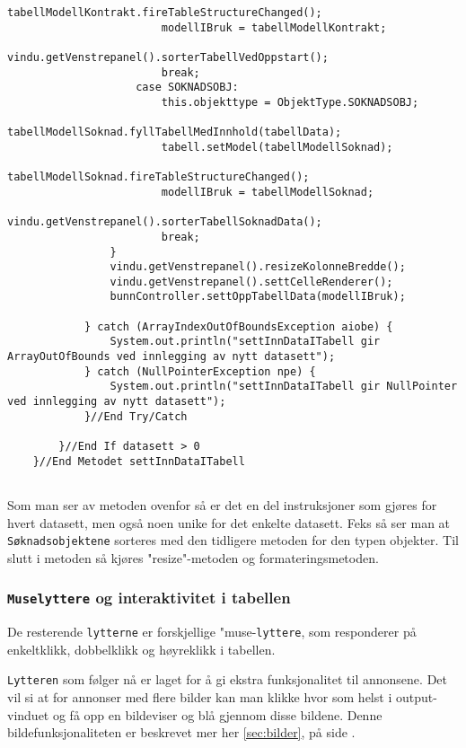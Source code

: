 \begin{lstlisting}[caption=Metoden \texttt{settInnDataITabell} i \texttt{ControllerTabell.java}]
                        tabellModellKontrakt.fireTableStructureChanged();
                        modellIBruk = tabellModellKontrakt;
                        vindu.getVenstrepanel().sorterTabellVedOppstart();
                        break;
                    case SOKNADSOBJ:
                        this.objekttype = ObjektType.SOKNADSOBJ;
                        tabellModellSoknad.fyllTabellMedInnhold(tabellData);
                        tabell.setModel(tabellModellSoknad);
                        tabellModellSoknad.fireTableStructureChanged();
                        modellIBruk = tabellModellSoknad;
                        vindu.getVenstrepanel().sorterTabellSoknadData();
                        break;
                }
                vindu.getVenstrepanel().resizeKolonneBredde();
                vindu.getVenstrepanel().settCelleRenderer();
                bunnController.settOppTabellData(modellIBruk);

            } catch (ArrayIndexOutOfBoundsException aiobe) {
                System.out.println("settInnDataITabell gir ArrayOutOfBounds ved innlegging av nytt datasett");
            } catch (NullPointerException npe) {
                System.out.println("settInnDataITabell gir NullPointer ved innlegging av nytt datasett");
            }//End Try/Catch

        }//End If datasett > 0
    }//End Metodet settInnDataITabell
        
\end{lstlisting}

Som man ser av metoden ovenfor så er det en del instruksjoner som gjøres for hvert datasett, men også noen unike for det enkelte datasett. Feks så ser man at \texttt{Søknadsobjektene} sorteres med den tidligere metoden for den typen objekter. Til slutt i metoden så kjøres "resize"-metoden og formateringsmetoden. 

\subsubsection{\texttt{Muselyttere} og interaktivitet i tabellen} \label{sec:interaktivitettabell}

De resterende \texttt{lytterne} er forskjellige "muse-\texttt{lyttere}, som responderer på enkeltklikk, dobbelklikk og høyreklikk i tabellen.


\texttt{Lytteren} som følger nå er laget for å gi ekstra funksjonalitet til annonsene. Det vil si at for annonser med flere bilder kan man klikke hvor som helst i output-vinduet og få opp en bildeviser og blå gjennom disse bildene. Denne bildefunksjonaliteten er beskrevet mer her \ref{sec:bilder}, på side \pageref{sec:bilder}.

